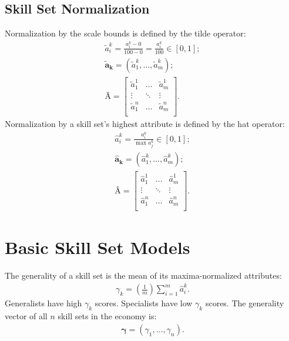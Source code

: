 \documentclass{elsarticle} %
\begin{document}
\subsection{Skill Set Normalization}
Normalization by the scale bounds is defined by the tilde operator:
\begin{gather}
    \tilde{a}_{i}^{k} =
    \frac{a_{i}^{k} - 0}{100 - 0} =
    \frac{a_{i}^{k}}{100}
    \in [0,1]
    ;\\
    \boldsymbol{\tilde{a}_{k}} =
    (\tilde{a}_{1}^{k}, \dots, \tilde{a}_{m}^{k})
    ;\\
    \textbf{Ã} =
    \begin{bmatrix}
        \tilde{a}_{1}^{1} & \hdots & \tilde{a}_{m}^{1} \\
        \vdots            & \ddots & \vdots            \\
        \tilde{a}_{1}^{n} & \hdots & \tilde{a}_{m}^{n} \\
    \end{bmatrix}
    .
\end{gather}
Normalization by a skill set's highest attribute is defined by the hat operator:
\begin{gather}
    \hat{a}_{i}^{k} =
    \frac{a_{i}^{k}}{\max{a_{j}^{k}}}
    \in [0,1]
    ;\\
    \boldsymbol{\hat{a}_{k}} =
    (\hat{a}_{1}^{k}, \dots, \hat{a}_{m}^{k})
    ;\\
    \textbf{Â} =
    \begin{bmatrix}
        \hat{a}_{1}^{1} & \hdots & \hat{a}_{m}^{1} \\
        \vdots          & \ddots & \vdots          \\
        \hat{a}_{1}^{n} & \hdots & \hat{a}_{m}^{n} \\
    \end{bmatrix}
    .
\end{gather}


\section{Basic Skill Set Models}
The generality of a skill set is the mean of its maxima-normalized attributes:
\begin{gather}
    \gamma_{k} = \left(\frac{1}{m}\right)\sum_{i=1}^{m}{\hat{a}_{i}^{k}}
    .
\end{gather}
Generalists have high $\gamma_{k}$ scores. Specialists have low $\gamma_{k}$ scores.
The generality vector of all $n$ skill sets in the economy is:
\begin{gather}
    \boldsymbol{\gamma} = (\gamma_{1}, \dots, \gamma_{n})
    .
\end{gather}
\end{document}
